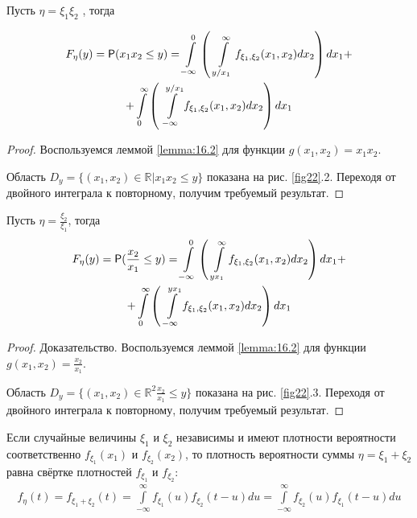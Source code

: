 \begin{lemma}
\label{lemma:16.4}
Пусть $\eta = \xi_1 \xi_2$ , тогда

\begin{gather*}
	F_\eta (y) = \P ( x_1x_2 \leq y ) =
	\int\limits_{-\infty}^{0}\left(
		\,\,\int\limits_{y/x_1}^{\infty} f_{\xi_1,\xi_2} (x_1, x_2 ) dx_2
	\right)dx_1+\\+
	\int\limits_{0}^{\infty}\left(
		\,\,\int\limits^{y/x_1}_{-\infty} f_{\xi_1,\xi_2} (x_1, x_2 ) dx_2
	\right)dx_1
\end{gather*}
\end{lemma}

\begin{proof}
	Воспользуемся леммой \ref{lemma:16.2} для функции $g(x_1 , x_2 ) = x_1 x_2$.

Область $D_y = \{(x_1 , x_2 ) \in \mathbb{R}| x_1 x_2 \leq y\}$ показана на рис. \ref{fig22}.2. Переходя от двойного интеграла к повторному, получим требуемый результат.
\end{proof}

\begin{lemma}
\label{lemma:16.5}
Пусть $\eta = \frac{\xi_2}{\xi_1}$, тогда
\begin{gather*}
	F_\eta (y) = \P ( \frac{x_2}{x_1} \leq y ) =
	\int\limits_{-\infty}^{0}\left(
		\,\,\int\limits_{yx_1}^{\infty} f_{\xi_1,\xi_2} (x_1, x_2 ) dx_2
	\right)dx_1+\\+
	\int\limits_{0}^{\infty}\left(
		\,\,\int\limits^{yx_1}_{-\infty} f_{\xi_1,\xi_2} (x_1, x_2 ) dx_2
	\right)dx_1
\end{gather*}
\end{lemma}
\begin{proof}
Доказательство. Воспользуемся леммой \ref{lemma:16.2} для функции $g(x_1 , x_2 ) = \frac{x_2}{x_1}$.

Область $D_y = \{(x_1 , x_2 ) \in \mathbb{R}^2  \frac{x_2}{x_1} \leq y\}$ показана на рис. \ref{fig22}.3. Переходя от двойного интеграла к повторному, получим требуемый результат.
\end{proof}

\begin{lemma}[О свёртке]
\label{lemma:16.6}
	Если случайные величины $\xi_1$ и $\xi_2$ независимы
и имеют плотности вероятности соответственно $f_{\xi_1} (x_1 )$ и $f_{\xi_2} (x_2 )$, то плотность вероятности суммы $\eta = \xi_1 + \xi_2$ равна свёртке плотностей $f_{\xi_1}$ и $f_{\xi_2}$:
\begin{gather*}
	f_\eta (t)=f_{\xi_1+\xi_2}(t)=\int\limits_{-\infty}^{\infty} f_{\xi_1} (u)f_{\xi_2} (t - u) du=
	\int\limits_{-\infty}^{\infty} f_{\xi_2}(u)f_{\xi_1} (t - u) du
\end{gather*}
\end{lemma}

